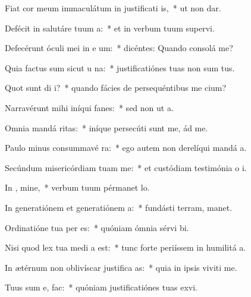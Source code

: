 \item Fiat cor meum immaculátum in justificati is,~* ut non dar.
\item Defécit in salutáre tuum  a:~* et in verbum tuum supervi.
\item Defecérunt óculi mei in e um:~* dicéntes: Quando consolá me?
\item Quia factus sum sicut u  na:~* justificatiónes tuas non sum tus.
\item Quot sunt di  i?~* quando fácies de persequéntibus me cium?
\item Narravérunt mihi iníqui fanes:~* sed non ut  a.
\item Omnia mandá  ritas:~* iníque persecúti sunt me, ád me.
\item Paulo minus consummavé   ra:~* ego autem non derelíqui mandá a.
\item Secúndum misericórdiam tuam  me:~* et custódiam testimónia o i.
\item In , mine,~* verbum tuum pérmanet  lo.
\item In generatiónem et generatiónem  a:~* fundásti terram,  manet.
\item Ordinatióne tua per es:~* quóniam ómnia sérvi bi.
\item Nisi quod lex tua medi a est:~* tunc forte periíssem in humilitá a.
\item In ætérnum non oblivíscar justifica as:~* quia in ipsis viviti me.
\item Tuus sum e,   fac:~* quóniam justificatiónes tuas exvi.
